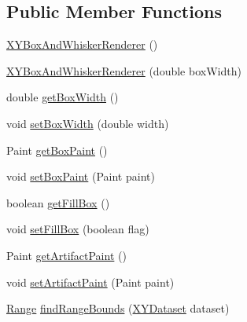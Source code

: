 \subsection*{Public Member Functions}
\begin{DoxyCompactItemize}
\item 
\mbox{\hyperlink{classorg_1_1jfree_1_1chart_1_1renderer_1_1xy_1_1_x_y_box_and_whisker_renderer_a48851481ed9a6b77b3190344008e256a}{X\+Y\+Box\+And\+Whisker\+Renderer}} ()
\item 
\mbox{\hyperlink{classorg_1_1jfree_1_1chart_1_1renderer_1_1xy_1_1_x_y_box_and_whisker_renderer_a50900b10c3e47c886d21fe67fdfc1c44}{X\+Y\+Box\+And\+Whisker\+Renderer}} (double box\+Width)
\item 
double \mbox{\hyperlink{classorg_1_1jfree_1_1chart_1_1renderer_1_1xy_1_1_x_y_box_and_whisker_renderer_a45c1aed1e263bd3a0078270316a6af6b}{get\+Box\+Width}} ()
\item 
void \mbox{\hyperlink{classorg_1_1jfree_1_1chart_1_1renderer_1_1xy_1_1_x_y_box_and_whisker_renderer_a315ca989a335f58c5d08019fb3f519f8}{set\+Box\+Width}} (double width)
\item 
Paint \mbox{\hyperlink{classorg_1_1jfree_1_1chart_1_1renderer_1_1xy_1_1_x_y_box_and_whisker_renderer_a0ee3c33a3c41cc5604874f12a26e16f7}{get\+Box\+Paint}} ()
\item 
void \mbox{\hyperlink{classorg_1_1jfree_1_1chart_1_1renderer_1_1xy_1_1_x_y_box_and_whisker_renderer_a355259830b67806e031b3cda109cbbf9}{set\+Box\+Paint}} (Paint paint)
\item 
boolean \mbox{\hyperlink{classorg_1_1jfree_1_1chart_1_1renderer_1_1xy_1_1_x_y_box_and_whisker_renderer_ae2f5164473482624816b46841f7462af}{get\+Fill\+Box}} ()
\item 
void \mbox{\hyperlink{classorg_1_1jfree_1_1chart_1_1renderer_1_1xy_1_1_x_y_box_and_whisker_renderer_adca86c2d9224085f5d51c5d0f2994193}{set\+Fill\+Box}} (boolean flag)
\item 
Paint \mbox{\hyperlink{classorg_1_1jfree_1_1chart_1_1renderer_1_1xy_1_1_x_y_box_and_whisker_renderer_ae755a075361086f61d3d1f8ac7f2d652}{get\+Artifact\+Paint}} ()
\item 
void \mbox{\hyperlink{classorg_1_1jfree_1_1chart_1_1renderer_1_1xy_1_1_x_y_box_and_whisker_renderer_ae91dcdaf8a2b50953c0b13c4ee59b011}{set\+Artifact\+Paint}} (Paint paint)
\item 
\mbox{\hyperlink{classorg_1_1jfree_1_1data_1_1_range}{Range}} \mbox{\hyperlink{classorg_1_1jfree_1_1chart_1_1renderer_1_1xy_1_1_x_y_box_and_whisker_renderer_adc96bda51bf22ebb4fd9f6666be31f4d}{find\+Range\+Bounds}} (\mbox{\hyperlink{interfaceorg_1_1jfree_1_1data_1_1xy_1_1_x_y_dataset}{X\+Y\+Dataset}} dataset)

\end{DoxyCompactItemize}

